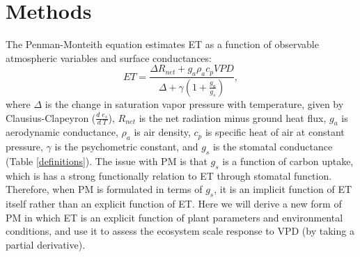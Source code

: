 \section{Methods}
\label{methods}
The Penman-Monteith equation \cite<hereafter PM,>[]{Penman_1948,
  Monteith_1965} estimates ET as a function of observable atmospheric
variables and surface conductances:
  \begin{equation}
    \label{orig_pen}
    ET = \frac{\Delta R_{net} + g_a \rho_a c_p VPD}{\Delta + \gamma(1 + \frac{g_a}{g_s})},
  \end{equation}
  where $\Delta$ is the change in saturation vapor pressure with
  temperature, given by Clausius-Clapeyron
  ($\frac{d \; e_s}{d \; T}$), $R_{net}$ is the net radiation minus
  ground heat flux, $g_a$ is aerodynamic conductance, $\rho_a$ is air
  density, $c_p$ is specific heat of air at constant pressure,
  $\gamma$ is the psychometric constant, and $g_s$ is the stomatal
  conductance (Table \ref{definitions}). The issue with PM is that
  $g_s$ is a function of carbon uptake, which is has a strong
  functionally relation to ET through stomatal function. Therefore,
  when PM is formulated in terms of $g_s$, it is an implicit function
  of ET itself rather than an explicit function of ET. Here we will
  derive a new form of PM in which ET is an explicit function of plant
  parameters and environmental conditions, and use it to assess the
  ecosystem scale response to VPD (by taking a partial derivative).

